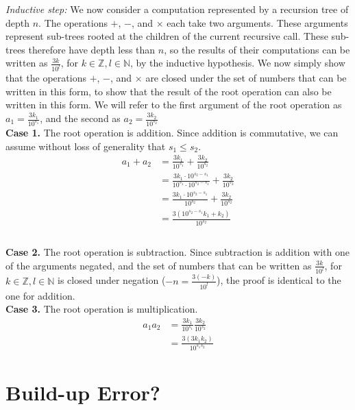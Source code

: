\documentclass{article}
\begin{document}
    \textit{Inductive step:} We now consider a computation represented by a recursion tree of depth $n$. The operations $+$, $-$, and $\times$ each take two arguments. These arguments represent sub-trees rooted at the children of the current recursive call. These sub-trees therefore have depth less than $n$, so the results of their computations can be written as $\frac{3k}{10^l}$, for $k \in \mathbb{Z}, l \in \mathbb{N}$, by the inductive hypothesis. We now simply show that the operations $+$, $-$, and $\times$ are closed under the set of numbers that can be written in this form, to show that the result of the root operation can also be written in this form. We will refer to the first argument of the root operation as $a_1=\frac{3k_1}{10^{s_1}}$, and the second as $a_2=\frac{3k_2}{10^{s_2}}$ \\
    
    \textbf{Case 1.} The root operation is addition. Since addition is commutative, we can assume without loss of generality that $s_1 \leq s_2$.
    \begin{align}
        a_1 + a_2 &= \frac{3k_1}{10^{s_1}} + \frac{3k_2}{10^{s_2}} \\
        &= \frac{3k_1\cdot 10^{s_2-s_1}}{10^{s_1}\cdot 10^{s_2-s_1}} + \frac{3k_2}{10^{s_2}} \\
        &= \frac{3k_1\cdot 10^{s_2-s_1}}{10^{s_2}} + \frac{3k_2}{10^{s_2}} \\
        &= \frac{3(10^{s_2-s_1}k_1+k_2)}{10^{s_2}} \\
    \end{align} \\
    
    \textbf{Case 2.} The root operation is subtraction. Since subtraction is addition with one of the arguments negated, and the set of numbers that can be written as $\frac{3k}{10^l}$, for $k \in \mathbb{Z}, l \in \mathbb{N}$ is closed under negation ($-n = \frac{3(-k)}{10^l}$), the proof is identical to the one for addition. \\
    
    \textbf{Case 3.} The root operation is multiplication. 
    \begin{align}
        a_1 a_2 &= \frac{3k_1}{10^{s_1}}\frac{3k_2}{10^{s_2}} \\
        &= \frac{3(3k_1k_2)}{10^{s_1 s_2}}
    \end{align}
\section{Build-up Error?}
\end{document}
